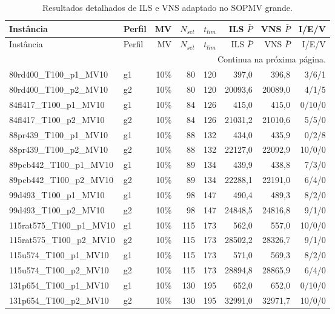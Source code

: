 \footnotesize
\begin{longtable}{llrrrrrr}
\caption{Resultados detalhados de ILS e VNS adaptado no SOPMV grande.}\label{tab:appendix-sopmv-large-detail}\\
\toprule
Inst\^ancia & Perfil & MV & $N_{set}$ & $t_{lim}$ & ILS $\bar P$ & VNS $\bar P$ & I/E/V \\
\midrule
\endfirsthead
\toprule
Inst\^ancia & Perfil & MV & $N_{set}$ & $t_{lim}$ & ILS $\bar P$ & VNS $\bar P$ & I/E/V \\
\midrule
\endhead
\midrule
\multicolumn{8}{r}{\footnotesize Continua na pr\'oxima p\'agina.}\\
\endfoot
\bottomrule
\endlastfoot
80rd400\_T100\_p1\_MV10 & g1 & 10\% & 80 & 120 & 397{,}0 & 396{,}8 & 3/6/1 \\
80rd400\_T100\_p2\_MV10 & g2 & 10\% & 80 & 120 & 20093{,}6 & 20089{,}0 & 4/1/5 \\
84fl417\_T100\_p1\_MV10 & g1 & 10\% & 84 & 126 & 415{,}0 & 415{,}0 & 0/10/0 \\
84fl417\_T100\_p2\_MV10 & g2 & 10\% & 84 & 126 & 21031{,}2 & 21010{,}6 & 5/5/0 \\
88pr439\_T100\_p1\_MV10 & g1 & 10\% & 88 & 132 & 434{,}0 & 435{,}9 & 0/2/8 \\
88pr439\_T100\_p2\_MV10 & g2 & 10\% & 88 & 132 & 22127{,}0 & 22092{,}9 & 10/0/0 \\
89pcb442\_T100\_p1\_MV10 & g1 & 10\% & 89 & 134 & 439{,}9 & 438{,}8 & 7/3/0 \\
89pcb442\_T100\_p2\_MV10 & g2 & 10\% & 89 & 134 & 22288{,}1 & 22191{,}0 & 6/4/0 \\
99d493\_T100\_p1\_MV10 & g1 & 10\% & 98 & 147 & 490{,}4 & 489{,}3 & 8/2/0 \\
99d493\_T100\_p2\_MV10 & g2 & 10\% & 98 & 147 & 24848{,}5 & 24816{,}8 & 9/1/0 \\
115rat575\_T100\_p1\_MV10 & g1 & 10\% & 115 & 173 & 562{,}0 & 557{,}0 & 10/0/0 \\
115rat575\_T100\_p2\_MV10 & g2 & 10\% & 115 & 173 & 28502{,}2 & 28326{,}7 & 9/1/0 \\
115u574\_T100\_p1\_MV10 & g1 & 10\% & 115 & 173 & 571{,}0 & 569{,}3 & 8/2/0 \\
115u574\_T100\_p2\_MV10 & g2 & 10\% & 115 & 173 & 28894{,}8 & 28865{,}9 & 6/4/0 \\
131p654\_T100\_p1\_MV10 & g1 & 10\% & 130 & 195 & 652{,}0 & 652{,}0 & 0/10/0 \\
131p654\_T100\_p2\_MV10 & g2 & 10\% & 130 & 195 & 32991{,}0 & 32971{,}7 & 10/0/0 \\

\end{longtable}
